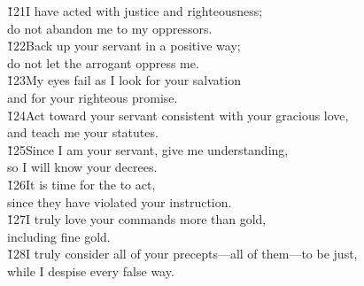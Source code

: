 \begin{poetry}
\poeml \v{121}I have acted with justice and righteousness; \\
\poemll    do not abandon me to my oppressors. \\
\poeml \v{122}Back up your servant in a positive way; \\
\poemll    do not let the arrogant oppress me. \\
\poeml \v{123}My eyes fail as I look for your salvation \\
\poemll    and for your righteous promise. \\
\poeml \v{124}Act toward your servant consistent with your gracious love, \\
\poemll    and teach me your statutes. \\
\poeml \v{125}Since I am your servant, give me understanding, \\
\poemll    so I will know your decrees. \\
\poeml \v{126}It is time for the  to act, \\
\poemll    since they have violated your instruction. \\
\poeml \v{127}I truly love your commands more than gold, \\
\poemll    including fine gold. \\
\poeml \v{128}I truly consider all of your precepts---all of them---to be just, \\
\poemll    while I despise every false way.
\end{poetry}

